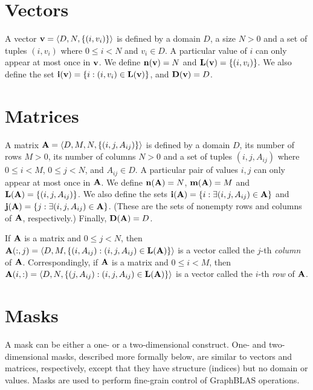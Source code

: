 \section{Vectors}
\label{Sec:Vectors}

A vector ${\bf v} = \langle D, N, \{ (i,v_i) \} \rangle$ is defined
by a domain $D$, a size $N>0$ and a set of tuples $(i,v_i)$ where
$0 \leq i < N$ and $v_i \in D$. A particular value of $i$ can only
appear at most once in ${\bf v}$. We define $\bold{n}({\bf v}) =
N$ and $\bold{L}({\bf v}) = \{ (i,v_i) \}$. We also define the set
${\bf i({\bf v})} = \{ i : (i,v_i) \in \bold{L}({\bf v}) \}$,
and $\bold{D}({\bf v}) = D$.

\section{Matrices}
\label{Sec:Matrices}

A matrix ${\bf A} = \langle D, M, N, \{ (i,j,A_{ij}) \} \rangle$ is
defined by a domain $D$, its number of rows $M>0$, its number of columns
$N>0$ and a set of tuples $(i,j,A_{ij})$ where $0 \leq i < M$, $0 \leq
j < N$, and $A_{ij} \in D$. A particular pair of values $i,j$ can only
appear at most once in ${\bf A}$. We define $\bold{n}({\bf A})
= N$,  $\bold{m}({\bf A}) = M$ and $\bold{L}({\bf A}) = \{
(i,j,A_{ij}) \}$.  We also define the sets ${\bf i({\bf A})} = \{
i : \exists (i,j,A_{ij}) \in {\bf A} \}$ and ${\bf j({\bf A})}
= \{ j : \exists (i,j,A_{ij}) \in {\bf A} \}$.  (These are the sets
of nonempty rows and columns of ${\bf A}$, respectively.)  Finally,
$\bold{D}({\bf A}) = D$.

If ${\bf A}$ is a matrix and $0 \leq j < N$, then ${\bf A}(:,j)
= \langle D, M, \{(i,A_{ij}) : (i,j,A_{ij}) \in \bold{L}({\bf A})
\} \rangle$ is a vector called the $j$-th \emph{column}
of ${\bf A}$. Correspondingly, if ${\bf A}$ is a matrix and
$0 \leq i < M$, then ${\bf A}(i,:) = \langle D, N, \{(j,A_{ij}) :
(i,j,A_{ij}) \in \bold{L}({\bf A}) \} \rangle$ is a vector called
the $i$-th \emph{row} of ${\bf A}$.

\section{Masks}
\label{Sec:Masks}

A mask can be either a one- or a two-dimensional construct.
One- and two-dimensional masks, described more formally below, are
similar to vectors and matrices, respectively, except that they have
structure (indices) but no domain or values.
Masks are used to perform fine-grain control of GraphBLAS operations.

